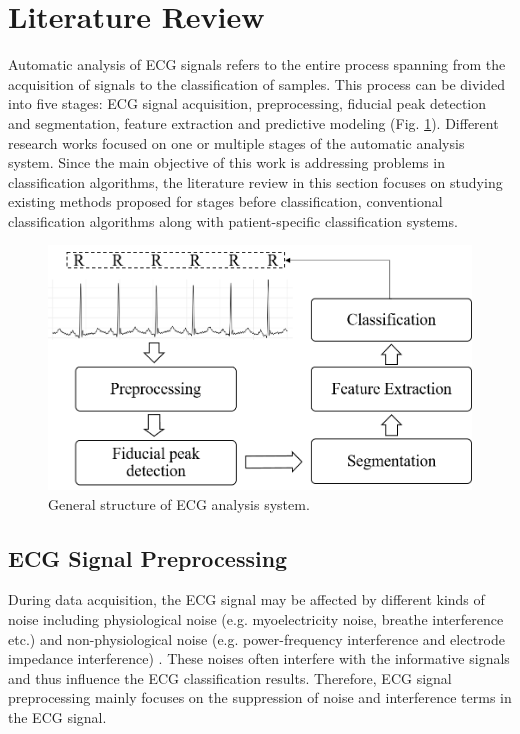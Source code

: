 \section{Literature Review}
Automatic analysis of ECG signals refers to the entire process spanning from the acquisition of signals to the classification of samples. This process can be divided into five stages: ECG signal acquisition, preprocessing, fiducial peak detection and segmentation, feature extraction and predictive modeling (Fig. \ref{fig:1-1}). Different research works focused on one or multiple stages of the automatic analysis system. Since the main objective of this work is addressing problems in classification algorithms, the literature review in this section focuses on studying existing methods proposed for stages before classification, conventional classification algorithms along with patient-specific classification systems. 

 \begin{figure}[thpb]
 	\centering
 	\includegraphics[scale=0.7]{Fig/general_flow.png}  
 	\caption{General structure of ECG analysis system.}
 	\label{fig:1-1}
 \end{figure}


\subsection{ECG Signal Preprocessing}

During data acquisition, the ECG signal may be affected by  different kinds of noise including physiological noise (e.g. myoelectricity noise, breathe interference etc.) and non-physiological noise (e.g. power-frequency interference and electrode impedance interference) \cite{denoise}. These noises often interfere with the informative signals and thus influence the ECG classification results. Therefore, ECG signal preprocessing mainly focuses on the suppression of noise and interference terms in the ECG signal.


